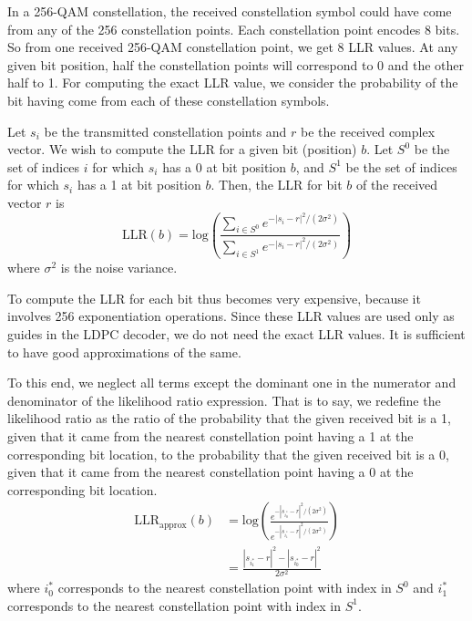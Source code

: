 In a 256-QAM constellation, the received constellation symbol could have come
from any of the 256 constellation points. Each constellation point encodes 8
bits. So from one received 256-QAM constellation point, we get 8 LLR values. At
any given bit position, half the constellation points will correspond to 0 and
the other half to 1. For computing the exact LLR value, we consider the
probability of the bit having come from each of these constellation symbols.

Let $s_i$ be the transmitted constellation points and $r$ be the received
complex vector. We wish to compute the LLR for a given bit (position) $b$. Let
$S^0$ be the set of indices $i$ for which $s_i$ has a 0 at bit position $b$,
and $S^1$ be the set of indices for which $s_i$ has a 1 at bit position $b$.
Then, the LLR for bit $b$ of the received vector $r$ is
\begin{equation}
	\text{LLR}(b) = \text{log} \left (
		\frac{ \sum_{i \in S^0}{e^{- |s_i - r|^2 / (2 \sigma^2)}} }
		     { \sum_{i \in S^1}{e^{- |s_i - r|^2 / (2 \sigma^2)}} }
		\right )
\end{equation}
where $\sigma^2$ is the noise variance.

To compute the LLR for each bit thus becomes very expensive, because it
involves 256 exponentiation operations. Since these LLR values are used only as
guides in the LDPC decoder, we do not need the exact LLR values. It is
sufficient to have good approximations of the same.

To this end, we neglect all terms except the dominant one in the numerator and
denominator of the likelihood ratio expression. That is to say, we redefine the
likelihood ratio as the ratio of the probability that the given received bit is
a 1, given that it came from the nearest constellation point having a 1 at the
corresponding bit location, to the probability that the given received bit is a
0, given that it came from the nearest constellation point having a 0 at the
corresponding bit location.
\begin{align}
	\text{LLR}_{\text{approx}}(b) &= \text{log} \left (
		\frac{ e^{- |s_{i^*_0} - r|^2 / (2 \sigma^2)} }
		     { e^{- |s_{i^*_1} - r|^2 / (2 \sigma^2)} }
		\right ) \\
		&= \frac{|s_{i^*_1} - r|^2 - |s_{i^*_0} - r|^2}{2 \sigma^2}
\end{align}
where $i^*_0$ corresponds to the nearest constellation point with index in
$S^0$ and $i^*_1$ corresponds to the nearest constellation point with index in
$S^1$.

